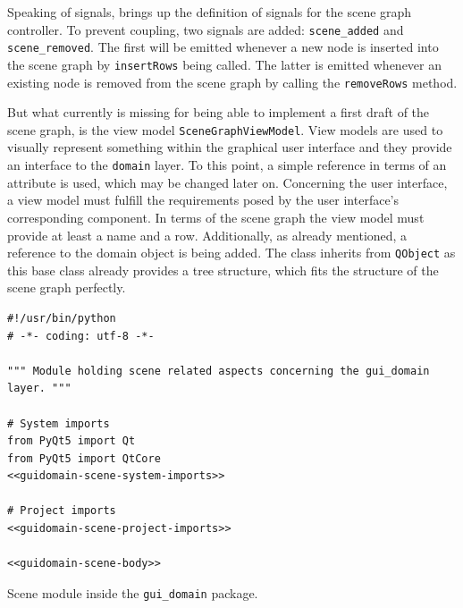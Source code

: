 \documentclass[10pt, openright, notitlepage]{scrreprt}
\begin{document}
Speaking of signals, brings up the definition of signals for the scene graph
controller. To prevent coupling, two signals are added: \texttt{scene\_added}
and \texttt{scene\_removed}. The first will be emitted whenever a new node is
inserted into the scene graph by \texttt{insertRows} being called. The latter
is emitted whenever an existing node is removed from the scene graph by calling
the \texttt{removeRows} method.

But what currently is missing for being able to implement a first draft of the
scene graph, is the view model \texttt{SceneGraphViewModel}. View models are
used to visually represent something within the graphical user interface and
they provide an interface to the \texttt{domain} layer. To this point, a
simple reference in terms of an attribute is used, which may be changed later
on. Concerning the user interface, a view model must fulfill the requirements
posed by the user interface's corresponding component. In terms of the scene
graph the view model must provide at least a name and a row. Additionally, as
already mentioned, a reference to the domain object is being added. The class
inherits from \texttt{QObject} as this base class already provides a tree
structure, which fits the structure of the scene graph perfectly.

\begin{listing}[H]
\begin{verbatim}
#!/usr/bin/python
# -*- coding: utf-8 -*-

""" Module holding scene related aspects concerning the gui_domain layer. """

# System imports
from PyQt5 import Qt
from PyQt5 import QtCore
<<guidomain-scene-system-imports>>

# Project imports
<<guidomain-scene-project-imports>>

<<guidomain-scene-body>>
\end{verbatim}
\caption{\label{guidomain-scene}
Scene module inside the \texttt{gui\_domain} package.}
\end{listing}
\end{document}
